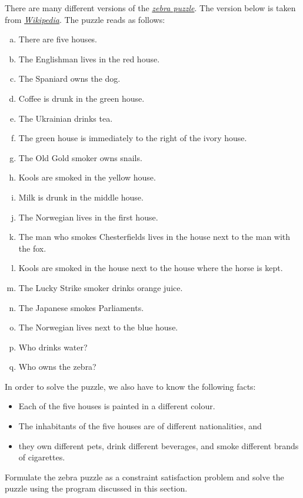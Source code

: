 \exercise
{}
There are many different versions of the \href{https://en.wikipedia.org/wiki/Zebra_Puzzle}{\emph{zebra puzzle}}.  
The version below is taken from \href{https://en.wikipedia.org/wiki/Zebra_Puzzle}{\emph{Wikipedia}}.  The
puzzle reads as follows:
\begin{enumerate}[(a)]
\item There are five houses.
\item The Englishman lives in the red house.
\item The Spaniard owns the dog.
\item Coffee is drunk in the green house.
\item The Ukrainian drinks tea.
\item The green house is immediately to the right of the ivory house.
\item The Old Gold smoker owns snails.
\item Kools are smoked in the yellow house.
\item Milk is drunk in the middle house.
\item The Norwegian lives in the first house.
\item The man who smokes Chesterfields lives in the house next to the man with the fox.
\item Kools are smoked in the house next to the house where the horse is kept.
\item The Lucky Strike smoker drinks orange juice.
\item The Japanese smokes Parliaments.
\item The Norwegian lives next to the blue house.
\item Who drinks water? 
\item Who owns the zebra?
\end{enumerate}
In order to solve the puzzle, we also have to know the following facts:
\begin{itemize}
\item Each of the five houses is painted in a {\color{blue}different} colour.
\item The inhabitants of the five houses are of {\color{blue}different} nationalities, and
\item they own {\color{blue}different} pets,  drink {\color{blue}different} beverages, and
      smoke {\color{blue}different} brands of cigarettes. 
\end{itemize}
Formulate the zebra puzzle as a constraint satisfaction problem and solve the puzzle using the program
discussed in this section.
\eoxs


